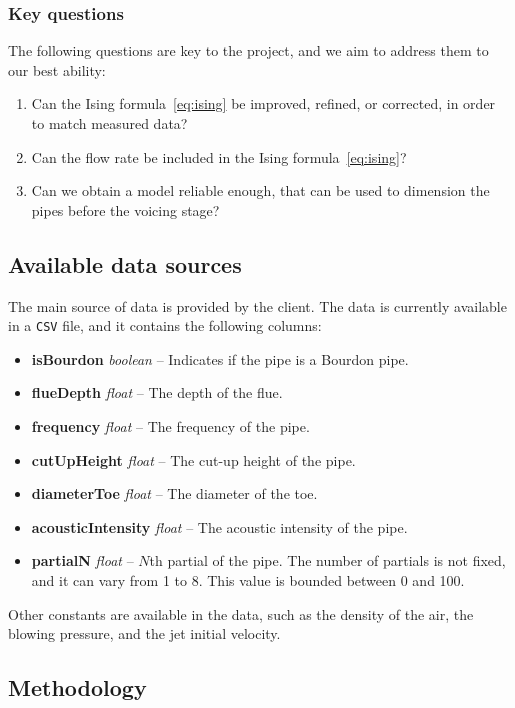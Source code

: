\documentclass{psu-plan}
\begin{document}
\subsubsection{Key questions}

The following questions are key to the project, and we aim to address them to
our best ability:
\begin{enumerate}
    \item Can the Ising formula~\ref{eq:ising} be improved, refined, or
        corrected, in order to match measured data?
    \item Can the flow rate be included in the Ising formula~\ref{eq:ising}?
    \item Can we obtain a model reliable enough, that can be used to dimension the
        pipes before the voicing stage?
\end{enumerate}

\subsection{Available data sources}

The main source of data is provided by the client.
The data is currently available in a \texttt{CSV} file, and it contains the
following columns:
\begin{itemize}
    \item \textbf{isBourdon} \textit{boolean} -- Indicates if the pipe is a Bourdon pipe.
    \item \textbf{flueDepth} \textit{float} -- The depth of the flue.
    \item \textbf{frequency} \textit{float} -- The frequency of the pipe.
    \item \textbf{cutUpHeight} \textit{float} -- The cut-up height of the pipe.
    \item \textbf{diameterToe} \textit{float} -- The diameter of the toe.
    \item \textbf{acousticIntensity} \textit{float} -- The acoustic intensity of the pipe.
    \item \textbf{partialN} \textit{float} -- \(N\)th partial of the pipe.
        The number of partials is not fixed, and it can vary from 1 to 8.
        This value is bounded between 0 and 100.
\end{itemize}
Other constants are available in the data, such as the density of the air,
the blowing pressure, and the jet initial velocity.

\subsection{Methodology}
\end{document}
